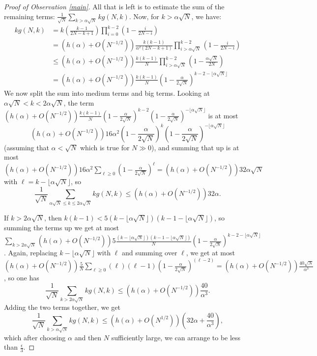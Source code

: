 \documentclass[11pt]{article}
\theoremstyle{definition}
\begin{document}
\begin{proof}[Proof of Observation \ref{main}]
All that is left is to estimate the sum of the remaining terms: $\frac{1}{\sqrt{N}}\displaystyle{\sum_{k > \alpha\sqrt{N}}}kg(N,k)$.  Now, for $k > \alpha\sqrt{N}$, we have:
\begin{align*}
kg(N,k) & = k\left(\frac{k-1}{2N-k+1}\right)\prod_{i = 0}^{k-2}\left(1-\frac{i}{2N-i}\right) \\
& = (h(\alpha) + O(N^{-1/2})) \frac{k(k-1)}{\alpha^2(2N-k+1)}\prod_{i>\alpha\sqrt{N}}^{k-2}\left(1-\frac{i}{2N-i}\right) \\
& \leq (h(\alpha) + O(N^{-1/2})) \frac{k(k-1)}{N} \prod_{i>\alpha\sqrt{N}}^{k-2}\left(1-\frac{\alpha\sqrt{N}}{2N}\right) \\
& = (h(\alpha) + O(N^{-1/2})) \frac{k(k-1)}{N} \left(1-\frac{\alpha}{2\sqrt{N}}\right)^{k-2-\lfloor\alpha\sqrt{N}\rfloor} 
\end{align*}
We now split the sum into medium terms and big terms.  Looking at $\alpha\sqrt{N} < k < 2\alpha\sqrt{N}$, the term $(h(\alpha) + O(N^{-1/2})) \frac{k(k-1)}{N} \left(1-\frac{\alpha}{2\sqrt{N}}\right)^{k-2} \left(1-\frac{\alpha}{2\sqrt{N}}\right)^{-\lfloor\alpha\sqrt{N}\rfloor}$ is at most $$(h(\alpha) + O(N^{-1/2}))16\alpha^2 \left(1-\frac{\alpha}{2\sqrt{N}}\right)^{k} \left(1-\frac{\alpha}{2\sqrt{N}}\right)^{-\lfloor\alpha\sqrt{N}\rfloor}$$ (assuming that $\alpha < \sqrt{N}$ which is true for $N \gg 0$), and summing that up is at most $(h(\alpha) + O(N^{-1/2}))16\alpha^2\sum_{\ell\geq 0}\left(1-\frac{\alpha}{2\sqrt{N}}\right)^\ell = (h(\alpha) + O(N^{-1/2}))32\alpha\sqrt{N}$ with $\ell = k-\lfloor\alpha\sqrt{N}\rfloor$, so $$\frac{1}{\sqrt{N}}\displaystyle{\sum_{\alpha\sqrt{N} \leq k \leq 2\alpha\sqrt{N}}}kg(N,k) \leq (h(\alpha) + O(N^{-1/2}))32\alpha.$$

If $k > 2\alpha\sqrt{N}$, then $k(k-1) < 5 (k-\lfloor\alpha\sqrt{N}\rfloor)(k-1-\lfloor\alpha\sqrt{N}\rfloor)$, so summing the terms up we get at most $\displaystyle{\sum_{k>2\alpha\sqrt{N}}} (h(\alpha) + O(N^{-1/2}))5\frac{(k-\lfloor\alpha\sqrt{N}\rfloor)(k-1-\lfloor\alpha\sqrt{N}\rfloor)}{N}\left(1-\frac{\alpha}{2\sqrt{N}}\right)^{k-2-\lfloor\alpha\sqrt{N}\rfloor}$.  Again, replacing $k-\lfloor\alpha\sqrt{N}\rfloor$ with $\ell$ and summing over $\ell$, we get at most $(h(\alpha) + O(N^{-1/2}))\frac{5}{N}\sum_{\ell\geq0} (\ell)(\ell-1)\left(1-\frac{\alpha}{2\sqrt{N}}\right)^(\ell-2) = (h(\alpha) + O(N^{-1/2}))\frac{40\sqrt{N}}{\alpha^3}$, so one has $$\frac{1}{\sqrt{N}}\sum_{k>2\alpha\sqrt{N}}kg(N,k) \leq (h(\alpha) + O(N^{-1/2}))\frac{40}{\alpha^3}.$$  Adding the two terms together, we get $$\frac{1}{\sqrt{N}}\sum_{k > \alpha\sqrt{N}} kg(N,k) \leq (h(\alpha) + O(N^{1/2}))\left(32\alpha + \frac{40}{\alpha^3}\right),$$ which after choosing $\alpha$ and then $N$ sufficiently large, we can arrange to be less than $\frac{\epsilon}{3}$.


\end{proof}
\end{document}

